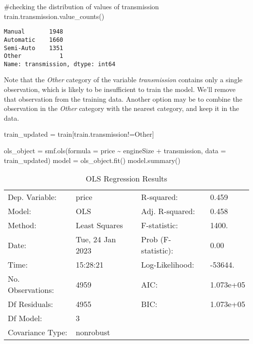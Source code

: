 \documentclass[
  letterpaper,
  DIV=11,
  numbers=noendperiod]{scrreprt}
\newenvironment{Shaded}{\begin{snugshade}}{\end{snugshade}}
\newcommand{\CommentTok}[1]{\textcolor[rgb]{0.37,0.37,0.37}{#1}}
\newcommand{\NormalTok}[1]{\textcolor[rgb]{0.00,0.23,0.31}{#1}}
\newcommand{\OperatorTok}[1]{\textcolor[rgb]{0.37,0.37,0.37}{#1}}
\newcommand{\StringTok}[1]{\textcolor[rgb]{0.13,0.47,0.30}{#1}}
\begin{document}
\begin{Shaded}
\begin{Highlighting}[]
\CommentTok{\#checking the distribution of values of transmission}
\NormalTok{train.transmission.value\_counts()}
\end{Highlighting}
\end{Shaded}

\begin{verbatim}
Manual       1948
Automatic    1660
Semi-Auto    1351
Other           1
Name: transmission, dtype: int64
\end{verbatim}

Note that the \emph{Other} category of the variable \emph{transmission}
contains only a single observation, which is likely to be insufficient
to train the model. We'll remove that observation from the training
data. Another option may be to combine the observation in the
\emph{Other} category with the nearest category, and keep it in the
data.

\begin{Shaded}
\begin{Highlighting}[]
\NormalTok{train\_updated }\OperatorTok{=}\NormalTok{ train[train.transmission}\OperatorTok{!=}\StringTok{\textquotesingle{}Other\textquotesingle{}}\NormalTok{]}
\end{Highlighting}
\end{Shaded}

\begin{Shaded}
\begin{Highlighting}[]
\NormalTok{ols\_object }\OperatorTok{=}\NormalTok{ smf.ols(formula }\OperatorTok{=} \StringTok{\textquotesingle{}price \textasciitilde{} engineSize + transmission\textquotesingle{}}\NormalTok{, data }\OperatorTok{=}\NormalTok{ train\_updated)}
\NormalTok{model }\OperatorTok{=}\NormalTok{ ols\_object.fit()}
\NormalTok{model.summary()}
\end{Highlighting}
\end{Shaded}

\begin{longtable}[]{@{}llll@{}}
\caption{OLS Regression Results}\tabularnewline
\toprule\noalign{}
\endfirsthead
\endhead
\bottomrule\noalign{}
\endlastfoot
Dep. Variable: & price & R-squared: & 0.459 \\
Model: & OLS & Adj. R-squared: & 0.458 \\
Method: & Least Squares & F-statistic: & 1400. \\
Date: & Tue, 24 Jan 2023 & Prob (F-statistic): & 0.00 \\
Time: & 15:28:21 & Log-Likelihood: & -53644. \\
No. Observations: & 4959 & AIC: & 1.073e+05 \\
Df Residuals: & 4955 & BIC: & 1.073e+05 \\
Df Model: & 3 & & \\
Covariance Type: & nonrobust & & \\
\end{longtable}
\end{document}
